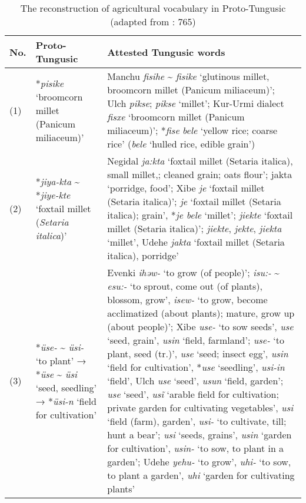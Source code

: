 \documentclass[output=paper,colorlinks,citecolor=brown]{langscibook}
\begin{document}
\begin{table}
\caption{The reconstruction of agricultural vocabulary in Proto-Tungusic (adapted from \citealt{Robbeetsetal2020}: 765)\label{table:8.2}}
\small
\begin{tabularx}{\textwidth}{ l >{\raggedright\arraybackslash}p{2.5cm} Q }
  \lsptoprule
No. &	Proto-Tungusic &	Attested Tungusic words\\
  \midrule
(1) &
*\textit{pisike} ‘broomcorn millet (Panicum miliaceum)’ & Manchu \textit{fisihe} {\textasciitilde} \textit{fisike} ‘glutinous millet, broomcorn millet (Panicum miliaceum)’; Ulch \textit{pikse};  \textit{pikse} ‘millet’; Kur-Urmi dialect \textit{fisxe} ‘broomcorn millet (Panicum miliaceum)’;  *\textit{fise} \textit{bele} ‘yellow rice; coarse rice’ (\textit{bele} ‘hulled rice, edible grain’)\\
\midrule
(2) & *\textit{jiya-kta} {\textasciitilde} *\textit{jiye-kte} ‘foxtail millet (\textit{Setaria italica})’ &
Negidal \textit{ja:kta} ‘foxtail millet (Setaria italica), small millet,; cleaned grain; oats flour’;  jakta ‘porridge, food’; Xibe \textit{je} ‘foxtail millet (Setaria italica)’;  \textit{je} ‘foxtail millet (Setaria italica); grain’,  *\textit{je bele} ‘millet’;   \textit{jiekte} ‘foxtail millet (Setaria italica)’;  \textit{jiekte}, \textit{jekte}, \textit{jiekta} ‘millet’, Udehe \textit{jakta} ‘foxtail millet (Setaria italica), porridge’\\
\midrule
(3) & *\textit{üse-} {\textasciitilde} \textit{üsi-} ‘to plant’ → *\textit{üse} {\textasciitilde} \textit{üsi} ‘seed, seedling’ → *\textit{üsi-n} ‘field for cultivation’ &
Evenki \textit{ihəw-} ‘to grow (of people)’;  \textit{isu:-} {\textasciitilde} \textit{esu:-} ‘to sprout, come out (of plants), blossom, grow’,  \textit{isew-} ‘to grow, become acclimatized (about plants); mature, grow up (about people)’; Xibe \textit{use-} ‘to sow seeds’, \textit{use} ‘seed, grain’, \textit{usin} ‘field, farmland’;  \textit{use-} ‘to plant, seed (tr.)’, \textit{use} ‘seed; insect egg’, \textit{usin} ‘field for cultivation’,  *\textit{use} ‘seedling’, \textit{usi-in} ‘field’, Ulch \textit{use} ‘seed’, \textit{usun} ‘field, garden’;  \textit{use} ‘seed’, \textit{usĩ} ‘arable field for cultivation; private garden for cultivating vegetables’,  \textit{usi} ‘field (farm), garden’, \textit{usi-} ‘to cultivate, till; hunt a bear’;  \textit{usi} ‘seeds, grains’, \textit{usin} ‘garden for cultivation’, \textit{usin-} ‘to sow, to plant in a garden’; Udehe \textit{yehu-} ‘to grow’, \textit{uhi-} ‘to sow, to plant a garden’, \textit{uhi} ‘garden for cultivating plants’\\  \midrule

\end{tabularx}
\end{table}
\end{document}
